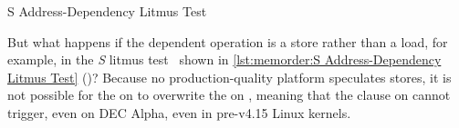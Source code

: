 \begin{listing}

\caption{S Address-Dependency Litmus Test}
\label{lst:memorder:S Address-Dependency Litmus Test}
\end{listing}

\begin{fcvref}
But what happens if the dependent operation is a store rather than
a load, for example, in the \emph{S}
litmus test~\cite{JadeAlglave2011ppcmem} shown in
\cref{lst:memorder:S Address-Dependency Litmus Test}
()?
Because no production-quality platform speculates stores,
it is not possible for the  on  to overwrite
the  on , meaning that the 
clause on  cannot trigger, even on DEC Alpha, even
in pre-v4.15 Linux kernels.
\end{fcvref}

